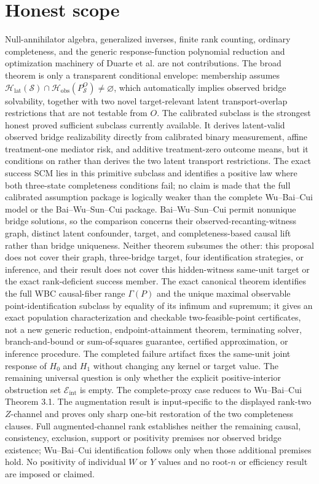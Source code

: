 \documentclass{article}
\begin{document}
\section{Honest scope}

Null-annihilator algebra, generalized inverses, finite rank counting, ordinary completeness, and the generic response-function polynomial reduction and optimization machinery of Duarte et al. are not contributions. The broad theorem is only a transparent conditional envelope: membership assumes \(\mathcal H_{\mathrm{lat}}(\mathcal S)\cap\mathcal H_{\mathrm{obs}}(P_{\mathcal S}^O)\neq\varnothing\), which automatically implies observed bridge solvability, together with two novel target-relevant latent transport-overlap restrictions that are not testable from \(O\). The calibrated subclass is the strongest honest proved sufficient subclass currently available. It derives latent-valid observed bridge realizability directly from calibrated binary measurement, affine treatment-one mediator risk, and additive treatment-zero outcome means, but it conditions on rather than derives the two latent transport restrictions. The exact success SCM lies in this primitive subclass and identifies a positive law where both three-state completeness conditions fail; no claim is made that the full calibrated assumption package is logically weaker than the complete Wu--Bai--Cui model or the Bai--Wu--Sun--Cui package. Bai--Wu--Sun--Cui permit nonunique bridge solutions, so the comparison concerns their observed-recanting-witness graph, distinct latent confounder, target, and completeness-based causal lift rather than bridge uniqueness. Neither theorem subsumes the other: this proposal does not cover their graph, three-bridge target, four identification strategies, or inference, and their result does not cover this hidden-witness same-unit target or the exact rank-deficient success member. The exact canonical theorem identifies the full WBC causal-fiber range \(\Gamma(P)\) and the unique maximal observable point-identification subclass by equality of its infimum and supremum; it gives an exact population characterization and checkable two-feasible-point certificates, not a new generic reduction, endpoint-attainment theorem, terminating solver, branch-and-bound or sum-of-squares guarantee, certified approximation, or inference procedure. The completed failure artifact fixes the same-unit joint response of \(H_0\) and \(H_1\) without changing any kernel or target value. The remaining universal question is only whether the explicit positive-interior obstruction set \(\mathcal E_{\mathrm{int}}\) is empty. The complete-proxy case reduces to Wu--Bai--Cui Theorem 3.1. The augmentation result is input-specific to the displayed rank-two \(Z\)-channel and proves only sharp one-bit restoration of the two completeness clauses. Full augmented-channel rank establishes neither the remaining causal, consistency, exclusion, support or positivity premises nor observed bridge existence; Wu--Bai--Cui identification follows only when those additional premises hold. No positivity of individual \(W\) or \(Y\) values and no root-\(n\) or efficiency result are imposed or claimed.
\end{document}
